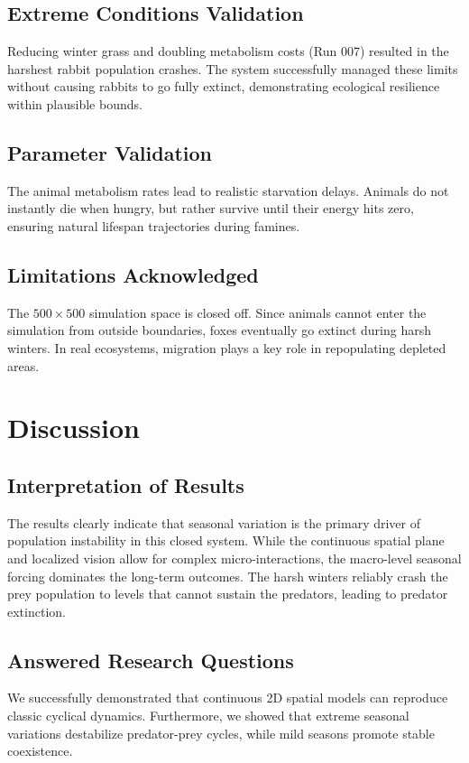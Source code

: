 \documentclass[12pt]{article}
\begin{document}
\subsection{Extreme Conditions Validation}
Reducing winter grass and doubling metabolism costs (Run 007) resulted in the harshest rabbit population crashes. The system successfully managed these limits without causing rabbits to go fully extinct, demonstrating ecological resilience within plausible bounds.

\subsection{Parameter Validation}
The animal metabolism rates lead to realistic starvation delays. Animals do not instantly die when hungry, but rather survive until their energy hits zero, ensuring natural lifespan trajectories during famines.

\subsection{Limitations Acknowledged}
The $500 \times 500$ simulation space is closed off. Since animals cannot enter the simulation from outside boundaries, foxes eventually go extinct during harsh winters. In real ecosystems, migration plays a key role in repopulating depleted areas.

\section{Discussion}

\subsection{Interpretation of Results}
The results clearly indicate that seasonal variation is the primary driver of population instability in this closed system. While the continuous spatial plane and localized vision allow for complex micro-interactions, the macro-level seasonal forcing dominates the long-term outcomes. The harsh winters reliably crash the prey population to levels that cannot sustain the predators, leading to predator extinction.

\subsection{Answered Research Questions}
We successfully demonstrated that continuous 2D spatial models can reproduce classic cyclical dynamics. Furthermore, we showed that extreme seasonal variations destabilize predator-prey cycles, while mild seasons promote stable coexistence.
\end{document}
